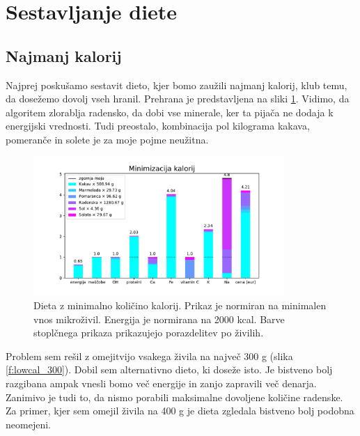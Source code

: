 \documentclass[a4paper, 12pt, slovene]{article}
\numberwithin{equation}{section}
\begin{document}
\section{Sestavljanje diete}
\subsection{Najmanj kalorij}
Najprej poskušamo sestavit dieto, kjer bomo zaužili najmanj kalorij, klub temu, da dosežemo dovolj vseh hranil. Prehrana je predstavljena na sliki \ref{f:lowcal}. Vidimo, da algoritem zlorablja radensko, da dobi vse minerale, ker ta pijača ne dodaja k energijski vrednosti. Tudi preostalo, kombinacija pol kilograma kakava, pomeranče in solete je za moje pojme neužitna.

\begin{figure}[H]
\centering
\includegraphics[width=0.85\textwidth]{grafi/graf_Low_calory_2000.pdf}
\caption{Dieta z minimalno količino kalorij. Prikaz je normiran na minimalen vnos mikroživil. Energija je normirana na 2000 kcal. Barve stoplčnega prikaza prikazujejo porazdelitev po živilih.}
\label{f:lowcal}
\end{figure}

Problem sem rešil z  omejitvijo vsakega živila na največ 300 g (slika \ref{f:lowcal_300}). Dobil sem alternativno dieto, ki doseže isto. Je bistveno bolj razgibana ampak vnesli bomo več energije in zanjo zapravili več denarja. Zanimivo je tudi to, da nismo porabili maksimalne dovoljene količine radenske. Za primer, kjer sem omejil živila na 400 g je dieta zgledala bistveno bolj podobna neomejeni.
\end{document}
